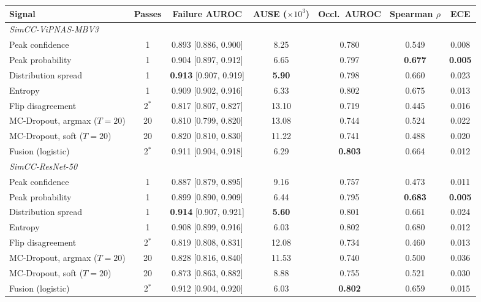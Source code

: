 \begin{tabular}{lcccccc}
\toprule
Signal & Passes & Failure AUROC & AUSE ($\times 10^{3}$) & Occl.\ AUROC & Spearman $\rho$ & ECE \\
\midrule
\multicolumn{7}{l}{\textit{SimCC-ViPNAS-MBV3}} \\
Peak confidence & 1 & 0.893 {\scriptsize [0.886, 0.900]} & 8.25 & 0.780 & 0.549 & 0.008 \\
Peak probability & 1 & 0.904 {\scriptsize [0.897, 0.912]} & 6.65 & 0.797 & \textbf{0.677} & \textbf{0.005} \\
Distribution spread & 1 & \textbf{0.913} {\scriptsize [0.907, 0.919]} & \textbf{5.90} & 0.798 & 0.660 & 0.023 \\
Entropy & 1 & 0.909 {\scriptsize [0.902, 0.916]} & 6.33 & 0.802 & 0.675 & 0.013 \\
Flip disagreement & 2$^\ast$ & 0.817 {\scriptsize [0.807, 0.827]} & 13.10 & 0.719 & 0.445 & 0.016 \\
MC-Dropout, argmax ($T{=}20$) & 20 & 0.810 {\scriptsize [0.799, 0.820]} & 13.08 & 0.744 & 0.524 & 0.022 \\
MC-Dropout, soft ($T{=}20$) & 20 & 0.820 {\scriptsize [0.810, 0.830]} & 11.22 & 0.741 & 0.488 & 0.020 \\
Fusion (logistic) & 2$^\ast$ & 0.911 {\scriptsize [0.904, 0.918]} & 6.29 & \textbf{0.803} & 0.664 & 0.012 \\
\midrule
\multicolumn{7}{l}{\textit{SimCC-ResNet-50}} \\
Peak confidence & 1 & 0.887 {\scriptsize [0.879, 0.895]} & 9.16 & 0.757 & 0.473 & 0.011 \\
Peak probability & 1 & 0.899 {\scriptsize [0.890, 0.909]} & 6.44 & 0.795 & \textbf{0.683} & \textbf{0.005} \\
Distribution spread & 1 & \textbf{0.914} {\scriptsize [0.907, 0.921]} & \textbf{5.60} & 0.801 & 0.661 & 0.024 \\
Entropy & 1 & 0.908 {\scriptsize [0.899, 0.916]} & 6.03 & 0.802 & 0.680 & 0.012 \\
Flip disagreement & 2$^\ast$ & 0.819 {\scriptsize [0.808, 0.831]} & 12.08 & 0.734 & 0.460 & 0.013 \\
MC-Dropout, argmax ($T{=}20$) & 20 & 0.828 {\scriptsize [0.816, 0.840]} & 11.53 & 0.740 & 0.500 & 0.036 \\
MC-Dropout, soft ($T{=}20$) & 20 & 0.873 {\scriptsize [0.863, 0.882]} & 8.88 & 0.755 & 0.521 & 0.030 \\
Fusion (logistic) & 2$^\ast$ & 0.912 {\scriptsize [0.904, 0.920]} & 6.03 & \textbf{0.802} & 0.659 & 0.015 \\

\end{tabular}
